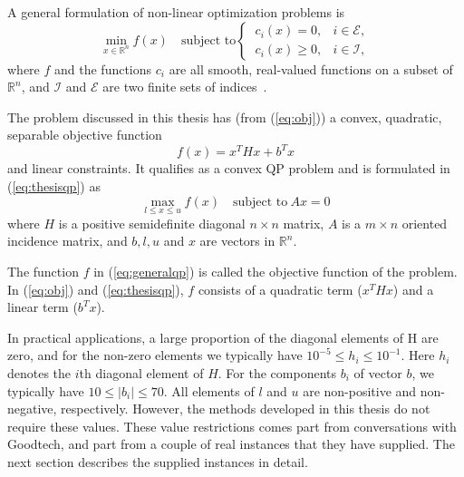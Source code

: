 A general formulation of non-linear optimization problems is
\begin{equation}
    \label{eq:generalqp}
    \min_{x \in \mathbb{R}^n} f(x) \quad \textrm{subject to}
    \begin{cases}
        ~c_i(x) = 0,   & i \in \mathcal{E}, \\
        ~c_i(x) \ge 0, & i \in \mathcal{I},
    \end{cases}
\end{equation}
where $f$ and the functions $c_i$ are all smooth, real-valued functions on a
subset of $\mathbb{R}^n$, and $\mathcal{I}$ and $\mathcal{E}$ are two finite
sets of indices~\cite{nocedal}.

The problem discussed in this thesis has (from (\ref{eq:obj})) a convex,
quadratic, separable objective function
\[
    f(x) = x^T H x + b^T x
\]
and linear constraints. It qualifies as a convex QP problem and is formulated in
(\ref{eq:thesisqp}) as
\[
    \max_{l \le x \le u} f(x)\quad\textrm{subject to}~Ax = 0
\]
where $H$ is a positive semidefinite diagonal $n \times n$ matrix, $A$ is a
$m \times n$ oriented incidence matrix, and $b, l, u$ and $x$ are vectors in
$\mathbb{R}^n$.

The function $f$ in (\ref{eq:generalqp}) is called the objective function of
the problem. In (\ref{eq:obj}) and (\ref{eq:thesisqp}), $f$ consists of a
quadratic term ($x^T H x$) and a linear term ($b^T x$).

In practical applications, a large proportion of the diagonal elements of H are
zero, and for the non-zero elements we typically have
$10^{-5} \le h_i \le 10^{-1}$. Here $h_i$ denotes the $i$th diagonal element of
$H$. For the components $b_i$ of vector $b$, we typically have
$10 \le |b_i| \le 70$. All elements of $l$ and $u$ are non-positive 
and non-negative, respectively. However, the methods developed in this thesis
do not require these values.
These value restrictions comes part from conversations with Goodtech, and
part from a couple of real instances that they have supplied.
The next section describes the supplied instances in detail.
